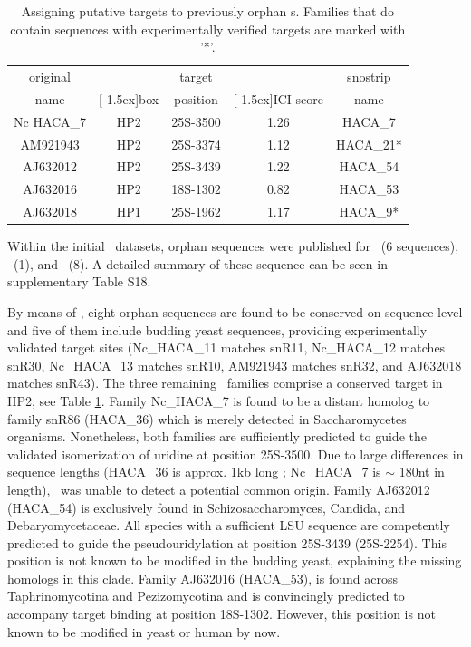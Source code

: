 \begin{table}
  \caption[Potential targets for orphan \haca s.]{Assigning putative targets to previously
    orphan \haca s. Families that do contain sequences with
    experimentally verified targets are marked with '*'. }
  \label{tab:orphan_hacas_short}
  \begin{center}
    \begin{footnotesize}
      \begin{tabular}{c|c|c|c|c}
        original&&target&&snostrip\\
        name&\raisebox{1.5ex}[-1.5ex]{box}&position&\raisebox{1.5ex}[-1.5ex]{ICI
            score}&name\\
        \hline
        Nc HACA\_7&HP2&25S-3500&1.26&HACA\_7\\
        AM921943&HP2&25S-3374&1.12&HACA\_21*\\
        AJ632012&HP2&25S-3439&1.22&HACA\_54\\
        AJ632016&HP2&18S-1302&0.82&HACA\_53\\
        AJ632018&HP1&25S-1962&1.17&HACA\_9*\\
      \end{tabular}
    \end{footnotesize}
  \end{center}
\end{table}

Within the initial \haca\ datasets, orphan sequences were published
for \ncr\ (6 sequences), \afu\ (1), and \spo\ (8).  A detailed summary
of these sequence can be seen in supplementary Table S18.

By means of \snostrip, eight orphan sequences are found to be
conserved on sequence level and five of them include budding yeast
sequences, providing experimentally validated target sites
(Nc\_HACA\_11 matches snR11, Nc\_HACA\_12 matches snR30, Nc\_HACA\_13
matches snR10, AM921943 matches snR32, and AJ632018 matches
snR43). The three remaining \sno\ families comprise a conserved target
in HP2, see Table \ref{tab:orphan_hacas_short}. Family Nc\_HACA\_7 is
found to be a distant homolog to family snR86 (HACA\_36) which is
merely detected in Saccharomycetes organisms. Nonetheless, both
families are sufficiently predicted to guide the validated
isomerization of uridine at position 25S-3500. Due to large
differences in sequence lengths (HACA\_36 is approx. 1kb long ;
Nc\_HACA\_7 is $\sim$ 180nt in length), \snostrip\ was unable to
detect a potential common origin. Family AJ632012 (HACA\_54) is
exclusively found in Schizosaccharomyces, Candida, and
Debaryomycetaceae. All species with a sufficient LSU sequence are
competently predicted to guide the pseudouridylation at position
25S-3439 (\sce 25S-2254). This position is not known to be modified in
the budding yeast, explaining the missing homologs in this
clade. Family AJ632016 (HACA\_53), is found across Taphrinomycotina
and Pezizomycotina and is convincingly predicted to accompany target
binding at position 18S-1302. However, this position is not known to
be modified in yeast or human by now.


